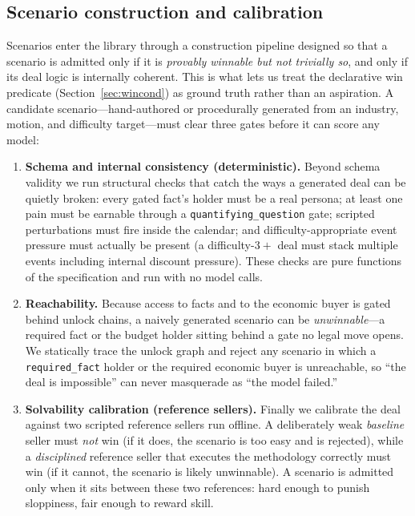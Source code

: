 \subsection{Scenario construction and calibration}
\label{sec:construction}
Scenarios enter the library through a construction pipeline designed so that a
scenario is admitted only if it is \emph{provably winnable but not trivially so},
and only if its deal logic is internally coherent. This is what lets us treat the
declarative win predicate (Section~\ref{sec:wincond}) as ground truth rather than
an aspiration. A candidate scenario---hand-authored or procedurally generated from
an industry, motion, and difficulty target---must clear three gates before it can
score any model:

\begin{enumerate}[leftmargin=1.4em,itemsep=2pt,topsep=2pt]
  \item \textbf{Schema and internal consistency (deterministic).} Beyond schema
  validity we run structural checks that catch the ways a generated deal can be
  quietly broken: every gated fact's holder must be a real persona; at least one
  pain must be earnable through a \texttt{quantifying\_question} gate; scripted
  perturbations must fire inside the calendar; and difficulty-appropriate event
  pressure must actually be present (a difficulty-$3{+}$ deal must stack multiple
  events including internal discount pressure). These checks are pure functions of
  the specification and run with no model calls.
  \item \textbf{Reachability.} Because access to facts and to the economic buyer is
  gated behind unlock chains, a naively generated scenario can be
  \emph{unwinnable}---a required fact or the budget holder sitting behind a gate no
  legal move opens. We statically trace the unlock graph and reject any scenario in
  which a \texttt{required\_fact} holder or the required economic buyer is
  unreachable, so ``the deal is impossible'' can never masquerade as ``the model
  failed.''
  \item \textbf{Solvability calibration (reference sellers).} Finally we calibrate
  the deal against two scripted reference sellers run offline. A deliberately weak
  \emph{baseline} seller must \emph{not} win (if it does, the scenario is too easy
  and is rejected), while a \emph{disciplined} reference seller that executes the
  methodology correctly must win (if it cannot, the scenario is likely unwinnable).
  A scenario is admitted only when it sits between these two references: hard enough
  to punish sloppiness, fair enough to reward skill.
\end{enumerate}

